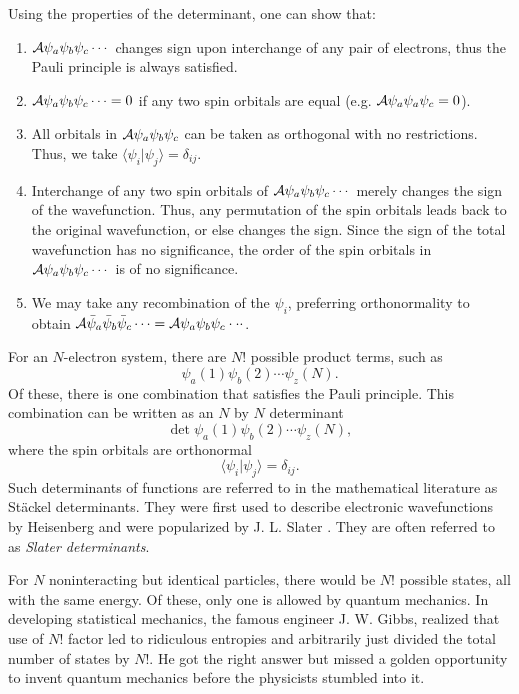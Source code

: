 Using the properties of the determinant, one can show that:
\begin{enumerate}
\item ${\cal A} \psi_a \psi_b \psi_c \cdots$ 
changes sign upon interchange of any pair of electrons, thus the Pauli
principle is always satisfied.
\item ${\cal A} \psi_a \psi_b \psi_c \cdots = 0$ 
if any two spin orbitals are equal (e.g. ${\cal A} \psi_a \psi_a
\psi_c = 0$).  
\item All orbitals in ${\cal A} \psi_a \psi_b \psi_c$ can be taken as
orthogonal with no restrictions.  Thus, we take $\langle \psi_i | \psi_j 
\rangle = \delta_{ij}$.  
\item Interchange of any two spin orbitals of 
${\cal A} \psi_a \psi_b \psi_c \cdots$ 
merely changes the sign of the wavefunction.  Thus, any permutation of the 
spin orbitals leads back to the original wavefunction, or else changes the 
sign.   Since the sign of the total wavefunction has no significance, the 
order of the spin orbitals in ${\cal A} \psi_a \psi_b \psi_c \cdots$ 
is of no significance.  
\item We may take any recombination of the $\psi_i$, preferring
orthonormality to obtain ${\cal A} \bar{\psi}_a \bar{\psi}_b
\bar{\psi}_c \cdots = {\cal A} \psi_a \psi_b \psi_c \cdot \cdot
\cdot$.
\end{enumerate}

For an $N$-electron system, there are $N!$ possible product terms, such as
\begin{equation}
\psi_a (1) \psi_b (2)\cdots\psi_z (N) .
\end{equation}
Of these, there is one combination that satisfies the Pauli principle.  
This combination can be written as an $N$ by $N$ determinant
\begin{equation}
\det\psi_a (1) \psi_b (2) \cdots \psi_z (N) ,
\end{equation}
where the spin orbitals are orthonormal
\begin{equation}
\langle \psi_i \vert \psi_j \rangle = \delta_{ij} .
\end{equation}
Such determinants of functions are referred to in the mathematical
literature as St\"ackel determinants.  They were first used to
describe electronic wavefunctions by Heisenberg and were popularized
by J. L.  Slater \cite{chap4-ref1}. They are often referred to as
\emph{Slater determinants}.

For $N$ noninteracting but identical particles, there would be $N!$ 
possible states, all with the same energy.  Of these, only one is allowed 
by quantum mechanics.  In developing statistical mechanics, the famous 
engineer J. W. Gibbs, realized that use of $N!$ factor led to ridiculous 
entropies and arbitrarily just divided the total number of
states by $N!$.  He got the right answer but missed a golden opportunity 
to invent quantum mechanics before the physicists stumbled into it.

